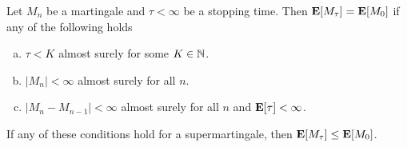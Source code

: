 		\begin{lemma}
			\label{optional stopping}
			Let $M_n$ be a martingale and $\tau<\infty$ be a stopping time. Then $\textbf{E}[M_\tau]=\textbf{E}[M_0]$ if any of the following holds
			\begin{enumerate}[(a)]
				\item $\tau<K$ almost surely for some $K\in\mathbb{N}$.
				\item $|M_n|<\infty$ almost surely for all $n$.
				\item $|M_n-M_{n-1}|<\infty$ almost surely for all $n$ and $\textbf{E}[\tau]<\infty$.
			\end{enumerate}
			If any of these conditions hold for a supermartingale, then $\textbf{E}[M_\tau]\leq\textbf{E}[M_0]$.
		\end{lemma}

